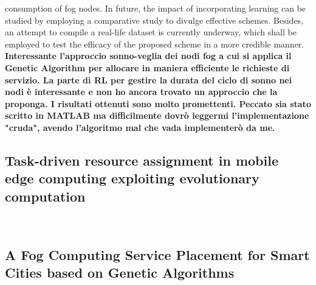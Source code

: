 consumption of fog nodes. In future, the impact of incorporating learning can be studied by employing a comparative study to divulge effective schemes. 
Besides, an attempt to compile a real-life dataset is currently underway, which shall be employed to test the efficacy of the proposed scheme in a more credible manner.\\
\textbf{Interessante l'approccio sonno-veglia dei nodi fog a cui si applica il Genetic Algorithm per allocare in maniera efficiente le richieste di servizio.
La parte di RL per gestire la durata del ciclo di sonno nei nodi è interessante e non ho ancora trovato un approccio che la proponga. I risultati ottenuti sono molto promettenti.
Peccato sia stato scritto in MATLAB ma difficilmente dovrò leggermi l'implementazione "cruda", avendo l'algoritmo mal che vada implementerò da me.}


\subsection{Task-driven resource assignment in mobile edge computing exploiting evolutionary computation}~\cite{wan2019task}


\subsection{A Fog Computing Service Placement for Smart Cities based on Genetic Algorithms}~\cite{canali2019fog}


